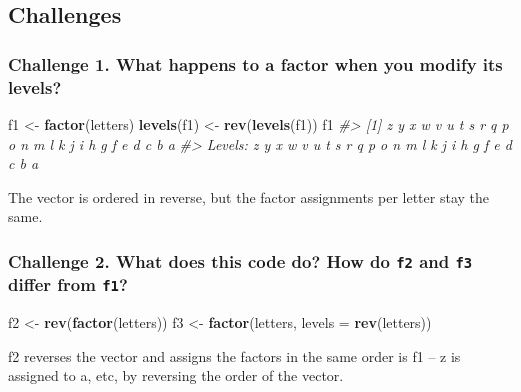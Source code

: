 \documentclass[]{book}
\newenvironment{Shaded}{\begin{snugshade}}{\end{snugshade}}
\newcommand{\KeywordTok}[1]{\textcolor[rgb]{0.13,0.29,0.53}{\textbf{#1}}}
\newcommand{\DataTypeTok}[1]{\textcolor[rgb]{0.13,0.29,0.53}{#1}}
\newcommand{\StringTok}[1]{\textcolor[rgb]{0.31,0.60,0.02}{#1}}
\newcommand{\CommentTok}[1]{\textcolor[rgb]{0.56,0.35,0.01}{\textit{#1}}}
\newcommand{\NormalTok}[1]{#1}
\begin{document}
\subsection{Challenges}\label{challenges-7}

\subsubsection*{Challenge 1. What happens to a factor when you modify
its
levels?}\label{challenge-1.-what-happens-to-a-factor-when-you-modify-its-levels}

\begin{Shaded}
\begin{Highlighting}[]
\NormalTok{f1 <-}\StringTok{ }\KeywordTok{factor}\NormalTok{(letters)}
\KeywordTok{levels}\NormalTok{(f1) <-}\StringTok{ }\KeywordTok{rev}\NormalTok{(}\KeywordTok{levels}\NormalTok{(f1))}
\NormalTok{f1}
\CommentTok{#>  [1] z y x w v u t s r q p o n m l k j i h g f e d c b a}
\CommentTok{#> Levels: z y x w v u t s r q p o n m l k j i h g f e d c b a}
\end{Highlighting}
\end{Shaded}

The vector is ordered in reverse, but the factor assignments per letter
stay the same.

\subsubsection*{\texorpdfstring{Challenge 2. What does this code do? How
do \texttt{f2} and \texttt{f3} differ from
\texttt{f1}?}{Challenge 2. What does this code do? How do f2 and f3 differ from f1?}}\label{challenge-2.-what-does-this-code-do-how-do-f2-and-f3-differ-from-f1}

\begin{Shaded}
\begin{Highlighting}[]
\NormalTok{f2 <-}\StringTok{ }\KeywordTok{rev}\NormalTok{(}\KeywordTok{factor}\NormalTok{(letters))}
\NormalTok{f3 <-}\StringTok{ }\KeywordTok{factor}\NormalTok{(letters, }\DataTypeTok{levels =} \KeywordTok{rev}\NormalTok{(letters))}
\end{Highlighting}
\end{Shaded}

f2 reverses the vector and assigns the factors in the same order is f1
-- z is assigned to a, etc, by reversing the order of the vector.
\end{document}
